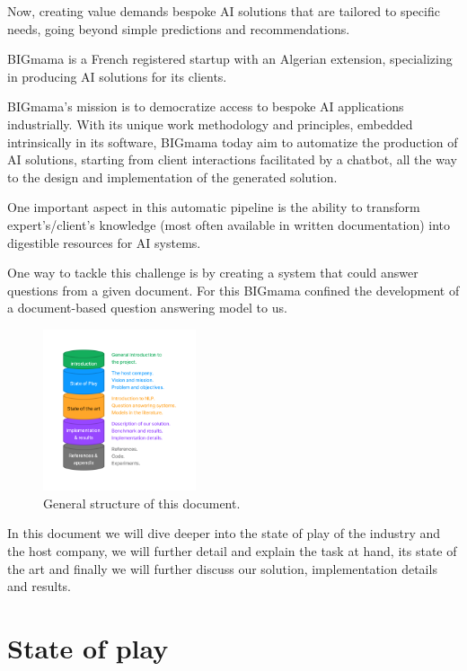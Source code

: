 \documentclass[a4paper,12pt]{article}
\begin{document}
Now, creating value demands bespoke AI solutions that are tailored to specific needs, 
going beyond simple predictions and recommendations.

BIGmama is a French registered startup with an Algerian extension, 
specializing in producing AI solutions for its clients.

BIGmama's mission is to democratize access to bespoke AI applications industrially. 
With its unique work methodology and principles, embedded intrinsically in its software, BIGmama today aim
to automatize the production of AI solutions, starting from client interactions facilitated by a chatbot, 
all the way to the design and implementation of the generated solution.

One important aspect in this automatic pipeline is the ability to transform expert's/client's knowledge (most often available in written documentation) 
into digestible resources for AI systems.  

One way to tackle this challenge is by creating a system that could answer questions from a given document. 
For this BIGmama confined the development of a document-based question answering model to us.

\begin{figure}[h]
    \begin{center}
      \includegraphics[width=0.4\textwidth]{figures/plan.png}
    \end{center}
  \caption{General structure of this document.}
    \label{fig:plan}
\end{figure}

In this document we will dive deeper into the state of play of the industry and the host company, 
we will further detail and explain the task at hand, its state of the art and finally we will further discuss our solution, implementation details and 
results.

\newpage

\section{State of play}
\end{document}
